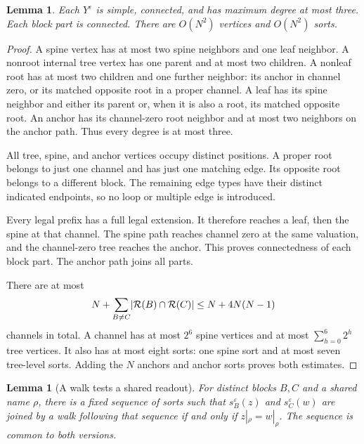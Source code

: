 \documentclass[11pt]{article}
\newtheorem{lemma}[theorem]{Lemma}
\theoremstyle{definition}
\newcommand{\cR}{\mathcal R}
\newcommand{\eps}{\varepsilon}
\DeclarePairedDelimiter{\abs}{\lvert}{\rvert}
\begin{document}
\begin{lemma}
\label{graph:colored-promises}
Each \(Y^\eps\) is simple, connected, and has maximum degree at most
three.  Each block part is connected.  There are \(O(N^2)\) vertices
and \(O(N^2)\) sorts.
\end{lemma}

\begin{proof}
A spine vertex has at most two spine neighbors and one leaf neighbor.
A nonroot internal tree vertex has one parent and at most two children.
A nonleaf root has at most two children and one further neighbor:
its anchor in channel zero, or its matched opposite root in a proper
channel.  A leaf has its spine neighbor and either its parent or,
when it is also a root, its matched opposite root.
An anchor has its channel-zero root neighbor and at most two neighbors
on the anchor path.
Thus every degree is at most three.

All tree, spine, and anchor vertices occupy distinct positions.
A proper root belongs to just one channel and has just one matching
edge.  Its opposite root belongs to a different block.
The remaining edge types have their distinct indicated endpoints,
so no loop or multiple edge is introduced.

Every legal prefix has a full legal extension.
It therefore reaches a leaf, then the spine at that channel.
The spine path reaches channel zero at the same valuation, and the
channel-zero tree reaches the anchor.
This proves connectedness of each block part.
The anchor path joins all parts.

There are at most
\[
 N+\sum_{B\ne C}\abs{\cR(B)\cap\cR(C)}
 \le N+4N(N-1)
\]
channels in total.
A channel has at most \(2^6\) spine vertices and at most
\(\sum_{h=0}^6 2^h\) tree vertices.
It also has at most eight sorts: one spine sort and at most seven
tree-level sorts.  Adding the \(N\) anchors and anchor sorts proves
both estimates.
\end{proof}

\begin{lemma}[A walk tests a shared readout]
\label{graph:readout-walk}
For distinct blocks \(B,C\) and a shared name \(\rho\), there is a
fixed sequence of sorts such that
\(s_B^\eps(z)\) and \(s_C^\eps(w)\) are joined by a walk following
that sequence if and only if \(z|_\rho=w|_\rho\).
The sequence is common to both versions.
\end{lemma}
\end{document}
